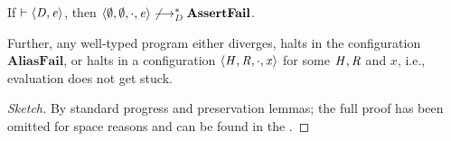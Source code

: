 \begin{theorem}[Soundness]
  \label{thm:soundness}
  If  $\vdash   \left\langle{ \mathit{D} ,  \mathit{e} }\right\rangle $, then
  $  \left\langle{  \emptyset  ,   \emptyset  ,   \cdot  ,  \mathit{e} }\right\rangle      \not \longrightarrow^*  _{ \mathit{D} }     \mathbf{AssertFail}  $.
  
  Further, any well-typed program either diverges, halts in the configuration $ \mathbf{AliasFail} $, or
  halts in a configuration $ \left\langle{ \mathit{H} ,  \mathit{R} ,   \cdot  ,  \mathit{x} }\right\rangle $ for some $\mathit{H}, \mathit{R}$ and $\mathit{x}$, i.e.,
  evaluation does not get stuck.
\end{theorem}
\begin{proof}[Sketch]
  By standard progress and preservation lemmas; 
  the full proof has been omitted for space reasons and can be found
  in the .


\end{proof}



